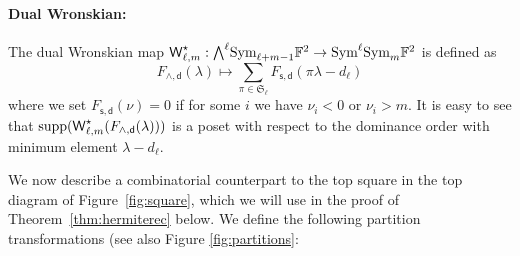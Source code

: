 \documentclass[a4paper]{extarticle}
\newcommand{\aS}{\mathfrak{S}}
\newcommand{\IF}{\mathbb{F}}
\newcommand{\Wedge}{{\textstyle\bigwedge}}
\newcommand{\Sym}{\textup{Sym}}
\newcommand{\la}{\lambda}
\newcommand{\supp}{\textup{supp}}
\newcommand{\Wronski}{\textsf{\textup{W}}}
\renewcommand{\d}{\mathsf{d}}
\newcommand{\s}{\mathsf{s}}
\numberwithin{theorem}{section}
\theoremstyle{definition}
\begin{document}
\paragraph{Dual Wronskian:}
The dual Wronskian map
$\Wronski_{\ell,m}^\star: \Wedge^\ell \Sym_{\ell+m-1} \IF^2 \to \Sym^\ell\Sym_m \IF^2$
is defined as
\[
F_{\wedge,\d}(\la) \mapsto \sum_{\pi\in \aS_\ell} F_{\s,\d}(\pi\la - d_\ell)
\]
where we set $F_{\s,\d}(\nu)=0$ if for some $i$ we have $\nu_i<0$ or $\nu_i>m$.
It is easy to see that $\supp(\Wronski^\star_{\ell,m}(F_{\wedge,\d}(\la)))$ is a poset with respect to the dominance order with minimum element $\la-d_\ell$.

We now describe a combinatorial counterpart to the top square in the top diagram of Figure~\ref{fig:square},
which we will use in the proof of Theorem~\ref{thm:hermiterec} below.
We define the following partition transformations (see also Figure \ref{fig:partitions}:
\end{document}

